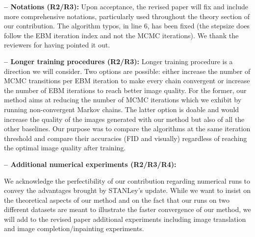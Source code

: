 \documentclass[10pt,twocolumn,letterpaper]{article}
\begin{document}
\noindent  \textbf{-- Notations (R2/R3):}
Upon acceptance, the revised paper will fix and include more comprehensive notations, particularly used throughout the theory section of our contribution.
The algorithm typos, in line 6, has been fixed (the stepsize does follow the EBM iteration index and not the MCMC iterations). We thank the reviewers for having pointed it out.

\noindent \textbf{-- Longer training procedures (R2/R3):}
Longer training procedure is a direction we will consider. 
Two options are possible: either increase the number of MCMC transitions per EBM iteration to make every chain convergent or increase the number of EBM iterations to reach better image quality.
For the former, our method aims at reducing the number of MCMC iterations which we exhibit by running non-convergent Markov chains. 
The latter option is doable and would increase the quality of the images generated with our method but also of all the other baselines.
Our purpose was to compare the algorithms at the same iteration threshold and compare their accuracies (FID and visually) regardless of reaching the optimal image quality after training.


\noindent \textbf{-- Additional numerical experiments (R2/R3/R4):}

We acknowledge the perfectibility of our contribution regarding numerical runs to convey the advantages brought by STANLey's update.
While we want to insist on the theoretical aspects of our method and on the fact that our runs on two different datasets are meant to illustrate the faster convergence of our method, we will add to the revised paper additional experiments including image translation and image completion/inpainting experiments.
\vspace{-0.1in}
\end{document}
